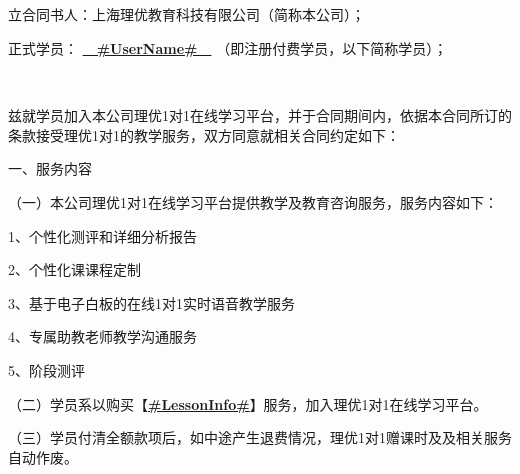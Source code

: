 \documentclass {ctexart}
\begin{document}
\setlength{\parskip}{0.7ex plus0.3ex minus0.3ex} %

\setcounter{page}{1} %
\headheight 14pt %


\pagestyle{fancy}

\fancyhf{}
\renewcommand{\headrulewidth}{0pt}
\fancyhead[LE,RO]{ \usebox{\headpic}   }      %




\subsection{}

立合同书人：上海理优教育科技有限公司（简称本公司）；


正式学员：   \underline{\textbf{　#UserName#　}} （即注册付费学员，以下简称学员）；

　

兹就学员加入本公司理优1对1在线学习平台，并于合同期间内，依据本合同所订的条款接受理优1对1的教学服务，双方同意就相关合同约定如下：


一、服务内容


（一）本公司理优1对1在线学习平台提供教学及教育咨询服务，服务内容如下：


1、个性化测评和详细分析报告	


2、个性化课课程定制


3、基于电子白板的在线1对1实时语音教学服务	


4、专属助教老师教学沟通服务


5、阶段测评


（二）学员系以购买【\underline{\textbf{#LessonInfo#}}】服务，加入理优1对1在线学习平台。


（三）学员付清全额款项后，如中途产生退费情况，理优1对1赠课时及及相关服务自动作废。
\end{document}
